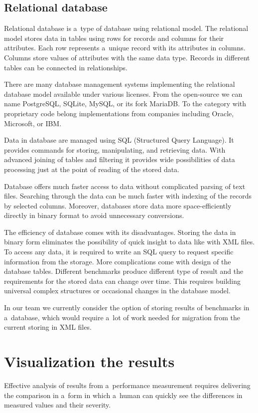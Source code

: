 \subsection{Relational database}
Relational database is a~type of database using relational model. The relational
model stores data in tables using rows for records and columns for their
attributes. Each row represents a~unique record with its attributes in columns.
Columns store values of attributes with the same data type. Records in different
tables can be connected in relationships.

There are many database management systems implementing the relational database
model available under various licenses. From the open-source we can name
PostgreSQL, SQLite, MySQL, or its fork MariaDB. To the category with proprietary
code belong implementations from companies including Oracle, Microsoft, or IBM.

Data in database are managed using SQL (Structured Query Language). It provides
commands for storing, manipulating, and retrieving data. With advanced joining of
tables and filtering it provides wide possibilities of data processing just at
the point of reading of the stored data.

Database offers much faster access to data without complicated parsing of text
files. Searching through the data can be much faster with indexing of the
records by selected columns. Moreover, databases store data more
space-efficiently directly in binary format to avoid unnecessary conversions.

The efficiency of database comes with its disadvantages. 
Storing the data in binary form eliminates the possibility of quick insight to
data like with XML files. To access any data, it is required to write an SQL query to
request specific information from the storage.
More complications come with design of the database tables. Different benchmarks
produce different type of result and the requirements for the stored data can change
over time. This requires building universal complex structures or occasional
changes in the database model.

In our team we currently consider the option of storing results of benchmarks in
a~database, which would require a~lot of work needed for migration from the
current storing in XML files.

\section{Visualization the results} \label{sec:visualization}
Effective analysis of results from a~performance measurement requires delivering
the comparison in a~form in which a~human can quickly see the differences in
measured values and their severity.

